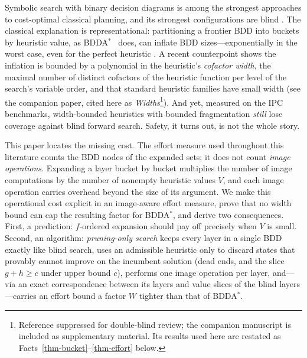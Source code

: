\documentclass[letterpaper]{article}
\newcommand{\values}{\ensuremath{V}}
\newcommand{\bddastar}{BDDA\ensuremath{^{*}}}
\theoremstyle{plain}
\theoremstyle{definition}
\theoremstyle{remark}
\begin{document}
Symbolic search with binary decision diagrams
\citep[BDDs;][]{bryant-ieeecomp1986,mcmillan-1993,edelkamp-helmert-ecp1999}
is among the strongest approaches to cost-optimal classical planning,
and its strongest configurations are blind
\citep{torralba-et-al-aij2017,speck-et-al-jair2025}. The classical
explanation is representational: partitioning a frontier BDD into
buckets by heuristic value, as \bddastar\ \citep{edelkamp-reffel-ki1998}
does, can inflate BDD sizes---exponentially in the worst case, even for
the perfect heuristic \citep{speck-et-al-icaps2020}. A recent
counterpoint shows the inflation is bounded by a polynomial in the
heuristic's \emph{cofactor width}, the maximal number of distinct
cofactors of the heuristic function per level of the search's variable
order, and that standard heuristic families have small width (see the
companion paper, cited here as \emph{Widths}\footnote{Reference
suppressed for double-blind review; the companion manuscript is included
as supplementary material. Its results used here are restated as
Facts~\ref{thm-bucket}--\ref{thm-effort} below.}). And yet, measured on
the IPC benchmarks, width-bounded heuristics with bounded fragmentation
\emph{still} lose coverage against blind forward search. Safety, it
turns out, is not the whole story.

This paper locates the missing cost. The effort measure used throughout
this literature \citep{speck-et-al-icaps2020} counts the BDD nodes of
the expanded sets; it does not count \emph{image operations}. Expanding
a layer bucket by bucket multiplies the number of image computations by
the number of nonempty heuristic values $\values$, and each image
operation carries overhead beyond the size of its argument. We make this
operational cost explicit in an image-aware effort measure, prove that
no width bound can cap the resulting factor for \bddastar, and derive
two consequences. First, a prediction: $f$-ordered expansion should pay
off precisely when $\values$ is small. Second, an algorithm:
\emph{pruning-only search} keeps every layer in a single BDD exactly
like blind search, uses an admissible heuristic only to discard states
that provably cannot improve on the incumbent solution (dead ends, and
the slice $g + h \geq c$ under upper bound $c$), performs one image
operation per layer, and---via an exact correspondence between its
layers and value slices of the blind layers---carries an effort bound a
factor $W$ tighter than that of \bddastar.
\end{document}
